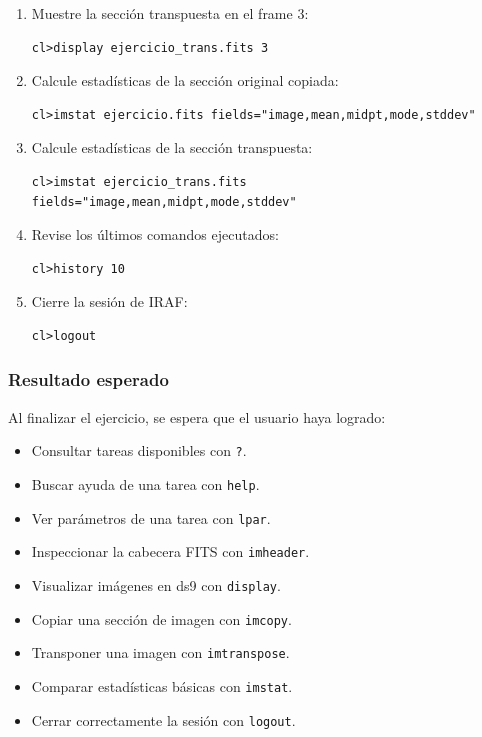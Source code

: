 \begin{enumerate}
\item Muestre la sección transpuesta en el frame 3:
\begin{verbatim}
cl>display ejercicio_trans.fits 3
\end{verbatim}

\item Calcule estadísticas de la sección original copiada:
\begin{verbatim}
cl>imstat ejercicio.fits fields="image,mean,midpt,mode,stddev"
\end{verbatim}

\item Calcule estadísticas de la sección transpuesta:
\begin{verbatim}
cl>imstat ejercicio_trans.fits fields="image,mean,midpt,mode,stddev"
\end{verbatim}

\item Revise los últimos comandos ejecutados:
\begin{verbatim}
cl>history 10
\end{verbatim}

\item Cierre la sesión de IRAF:
\begin{verbatim}
cl>logout
\end{verbatim}

\end{enumerate}

\subsubsection*{Resultado esperado}

Al finalizar el ejercicio, se espera que el usuario haya logrado:

\begin{itemize}
    \item Consultar tareas disponibles con \texttt{?}.
    \item Buscar ayuda de una tarea con \texttt{help}.
    \item Ver parámetros de una tarea con \texttt{lpar}.
    \item Inspeccionar la cabecera FITS con \texttt{imheader}.
    \item Visualizar imágenes en ds9 con \texttt{display}.
    \item Copiar una sección de imagen con \texttt{imcopy}.
    \item Transponer una imagen con \texttt{imtranspose}.
    \item Comparar estadísticas básicas con \texttt{imstat}.
    \item Cerrar correctamente la sesión con \texttt{logout}.
\end{itemize}

